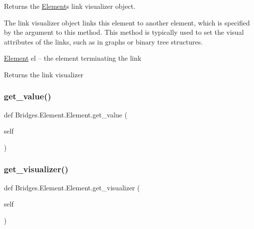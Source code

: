 Returns the \mbox{\hyperlink{class_bridges_1_1_element_1_1_element}{Element}}\textquotesingle{}s link visualizer object. 

The link visualizer object links this element to another element, which is specified by the argument to this method. This method is typically used to set the visual attributes of the links, such as in graphs or binary tree structures.

\mbox{\hyperlink{class_bridges_1_1_element_1_1_element}{Element}} el -- the element terminating the link

\begin{DoxyReturn}{Returns}
the link visualizer 
\end{DoxyReturn}
\mbox{\label{class_bridges_1_1_element_1_1_element_a283e6a2d0715eea745ed4cdcc8fc2ea6}} 
\subsubsection{\texorpdfstring{get\+\_\+value()}{get\_value()}}
{\footnotesize\ttfamily def Bridges.\+Element.\+Element.\+get\+\_\+value (\begin{DoxyParamCaption}\item[{}]{self }\end{DoxyParamCaption})}

\mbox{\label{class_bridges_1_1_element_1_1_element_a02945b22b48bf5517088a0db8b70fa94}} 
\subsubsection{\texorpdfstring{get\+\_\+visualizer()}{get\_visualizer()}}
{\footnotesize\ttfamily def Bridges.\+Element.\+Element.\+get\+\_\+visualizer (\begin{DoxyParamCaption}\item[{}]{self }\end{DoxyParamCaption})}



